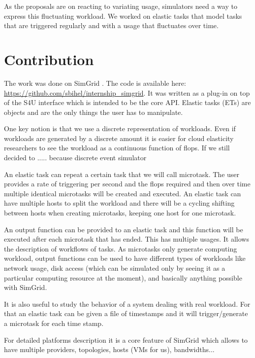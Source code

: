 \documentclass[a4paper, onecolumn, 11pt]{article}
\begin{document}
  As the proposals are on reacting to variating usage, simulators need a way to
  express this fluctuating workload. We worked on elastic tasks that model tasks
  that are triggered regularly and with a usage that fluctuates over time.


\section{Contribution} \label{contrib}
  The work was done on SimGrid \cite{casanova:hal-01017319}. The code is
  available here: \url{https://github.com/sbihel/internship_simgrid}. It was
  written as a plug-in on top of the S4U interface which is intended to be the
  core API. Elastic tasks (ETs) are objects and are the only things the user has
  to manipulate.
  
  One key notion is that we use a discrete representation of workloads. Even if 
  workloads are generated by a discrete amount it is easier for cloud 
  elasticity researchers to see the workload as a continuous function of flops. 
  If we still decided to ..... because discrete event simulator
   
  An elastic task can repeat a certain task that we will call microtask. The 
  user provides a rate of triggering per second and the flops required and then 
  over time multiple identical microtasks will be created and executed. An 
  elastic task can have multiple hosts to split the workload and there will be 
  a cycling shifting between hosts when creating microtasks, keeping one host 
  for one microtask.
  
  An output function can be provided to an elastic task and this function will 
  be executed after each microtask that has ended. This has multiple usages. It 
  allows the description of workflows of tasks. As microtasks only generate 
  computing workload, output functions can be used to have different types of 
  workloads like network usage, disk access (which can be simulated only by 
  seeing it as a particular computing resource at the moment), and basically 
  anything possible with SimGrid.
  
  It is also useful to study the behavior of a system dealing with real 
  workload. For that an elastic task can be given a file of timestamps and it 
  will trigger/generate a microtask for each time stamp.
  
  For detailed platforms description it is a core feature of SimGrid which 
  allows to have multiple providers, topologies, hosts (VMs for us), 
  bandwidths... %
\end{document}
